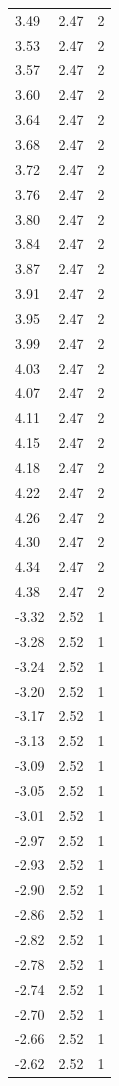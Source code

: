 \begin{longtable}{lrr}
  3.49 & 2.47 & 2 \\
  3.53 & 2.47 & 2 \\
  3.57 & 2.47 & 2 \\
  3.60 & 2.47 & 2 \\
  3.64 & 2.47 & 2 \\
  3.68 & 2.47 & 2 \\
  3.72 & 2.47 & 2 \\
  3.76 & 2.47 & 2 \\
  3.80 & 2.47 & 2 \\
  3.84 & 2.47 & 2 \\
  3.87 & 2.47 & 2 \\
  3.91 & 2.47 & 2 \\
  3.95 & 2.47 & 2 \\
  3.99 & 2.47 & 2 \\
  4.03 & 2.47 & 2 \\
  4.07 & 2.47 & 2 \\
  4.11 & 2.47 & 2 \\
  4.15 & 2.47 & 2 \\
  4.18 & 2.47 & 2 \\
  4.22 & 2.47 & 2 \\
  4.26 & 2.47 & 2 \\
  4.30 & 2.47 & 2 \\
  4.34 & 2.47 & 2 \\
  4.38 & 2.47 & 2 \\
  -3.32 & 2.52 & 1 \\
  -3.28 & 2.52 & 1 \\
  -3.24 & 2.52 & 1 \\
  -3.20 & 2.52 & 1 \\
  -3.17 & 2.52 & 1 \\
  -3.13 & 2.52 & 1 \\
  -3.09 & 2.52 & 1 \\
  -3.05 & 2.52 & 1 \\
  -3.01 & 2.52 & 1 \\
  -2.97 & 2.52 & 1 \\
  -2.93 & 2.52 & 1 \\
  -2.90 & 2.52 & 1 \\
  -2.86 & 2.52 & 1 \\
  -2.82 & 2.52 & 1 \\
  -2.78 & 2.52 & 1 \\
  -2.74 & 2.52 & 1 \\
  -2.70 & 2.52 & 1 \\
  -2.66 & 2.52 & 1 \\
  -2.62 & 2.52 & 1 \\

\end{longtable}

